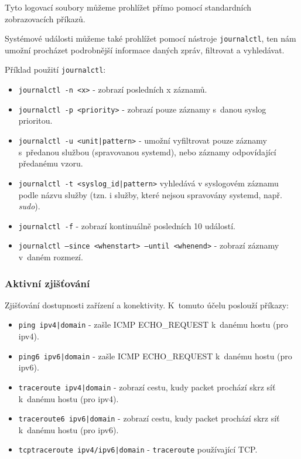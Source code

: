 Tyto logovací soubory můžeme prohlížet přímo pomocí standardních zobrazovacích příkazů.

Systémové události můžeme také prohlížet pomocí nástroje \texttt{journalctl}, ten nám umožní procházet podrobnější informace daných zpráv, filtrovat a vyhledávat.

Příklad použití \texttt{journalctl}:
\begin{itemize}
				\item \texttt{journalctl -n <x>} - zobrazí posledních x záznamů.
				\item \texttt{journalctl -p <priority>} - zobrazí pouze záznamy s~danou syslog prioritou.
				\item \texttt{journalctl -u <unit|pattern>} - umožní vyfiltrovat pouze
          záznamy s~předanou službou (spravovanou systemd), nebo záznamy
          odpovídající předanému vzoru.
        \item \texttt{journalctl -t <syslog\_id|pattern>} vyhledává v syslogovém záznamu
          podle názvu služby (tzn. i služby, které nejsou spravovány systemd,
          např. \emph{sudo}).
				\item \texttt{journalctl -f} - zobrazí kontinuálně posledních 10 událostí.
				\item \texttt{journalctl --since <whenstart> --until <whenend>} - zobrazí záznamy v~daném rozmezí.
\end{itemize}


\subsubsection{Aktivní zjišťování}
Zjišťování dostupnosti zařízení a konektivity. K~tomuto účelu poslouží příkazy:

\begin{itemize}
				\item \texttt{ping ipv4|domain} - zašle ICMP ECHO\_REQUEST k~danému hostu (pro ipv4).
				\item \texttt{ping6 ipv6|domain} - zašle ICMP ECHO\_REQUEST k~danému hostu (pro ipv6).
				\item \texttt{traceroute ipv4|domain} - zobrazí cestu, kudy packet prochází skrz síť k~danému hostu (pro ipv4).
				\item \texttt{traceroute6 ipv6|domain} - zobrazí cestu, kudy packet prochází skrz síť k~danému hostu (pro ipv6).
				\item \texttt{tcptraceroute ipv4/ipv6|domain} - \texttt{traceroute} používající TCP.
\end{itemize}

